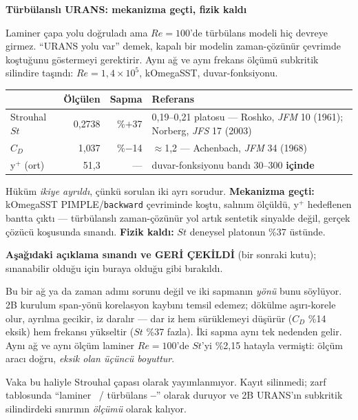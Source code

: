 \documentclass[11pt,a4paper]{article}
\newcommand{\ev}{\textcolor{iyi}{\textbf{\checkmark}}}
\newcommand{\hy}{\textcolor{kotu}{\textbf{--}}}
\newcommand{\kkkenar}{lacivert}
\newcommand{\kkzemin}{kod}
\newenvironment{renkkutu}[3]{%
  \renewcommand{\kkkenar}{#1}\renewcommand{\kkzemin}{#2}%
  \par\medskip\noindent
  \begin{lrbox}{\kutugovde}%
  \begin{minipage}{\dimexpr\linewidth-2\fboxsep-2\fboxrule\relax}\footnotesize
  \textcolor{#1}{\textbf{#3}}\par\vspace{3pt}%
}{%
  \end{minipage}%
  \end{lrbox}%
  \noindent\fcolorbox{\kkkenar}{\kkzemin}{\usebox{\kutugovde}}%
  \par\medskip
}
\newenvironment{reddedilir}[1]{\begin{renkkutu}{kotu}{kotubg}{#1}}{\end{renkkutu}}
\begin{document}
\begin{reddedilir}{Türbülanslı URANS: mekanizma geçti, fizik kaldı}
Laminer çapa yolu doğruladı ama $Re{=}100$'de türbülans modeli hiç devreye
girmez. ``URANS yolu var'' demek, kapalı bir modelin zaman-çözünür çevrimde
koştuğunu göstermeyi gerektirir. Aynı ağ ve aynı frekans ölçümü subkritik
silindire taşındı: $Re{=}1{,}4\times10^5$, kOmegaSST, duvar-fonksiyonu.

\begin{center}\footnotesize
\begin{tabular}{@{}lrrl@{}}
\toprule
& \textbf{Ölçülen} & \textbf{Sapma} & \textbf{Referans} \\
\midrule
Strouhal $St$ & 0{,}2738 & \%$+$37 & 0{,}19--0{,}21 platosu --- Roshko,
  \emph{JFM} 10 (1961); Norberg, \emph{JFS} 17 (2003) \\
$C_D$ & 1{,}037 & \%$-$14 & $\approx$1{,}2 --- Achenbach, \emph{JFM} 34 (1968) \\
y$^+$ (ort) & 51{,}3 & --- & duvar-fonksiyonu bandı 30--300 \textbf{içinde} \\
\bottomrule
\end{tabular}
\end{center}

\noindent Hüküm \emph{ikiye ayrıldı}, çünkü sorulan iki ayrı sorudur.
\textbf{Mekanizma geçti:} kOmegaSST PIMPLE/\texttt{backward} çevriminde koştu,
salınım ölçüldü, y$^+$ hedeflenen bantta çıktı --- türbülanslı zaman-çözünür yol
artık sentetik sinyalde değil, gerçek çözücü koşusunda sınandı.
\textbf{Fizik kaldı:} $St$ deneysel platonun \%37 üstünde.

\textbf{Aşağıdaki açıklama sınandı ve GERİ ÇEKİLDİ} (bir sonraki kutu); sınanabilir olduğu için buraya olduğu gibi bırakıldı.

Bu bir ağ ya da zaman adımı sorunu değil ve iki sapmanın \emph{yönü} bunu
söylüyor. 2B kurulum span-yönü korelasyon kaybını temsil edemez; dökülme
aşırı-korele olur, ayrılma gecikir, iz daralır --- dar iz hem sürüklemeyi
düşürür ($C_D$ \%14 eksik) hem frekansı yükseltir ($St$ \%37 fazla). İki
sapma aynı tek nedenden gelir. Aynı ağ ve aynı ölçüm laminer $Re{=}100$'de
$St$'yi \%2{,}15 hatayla vermişti: ölçüm aracı doğru, \emph{eksik olan üçüncü
boyuttur}.

Vaka bu haliyle Strouhal çapası olarak yayımlanmıyor. Kayıt silinmedi;
zarf tablosunda ``laminer \ev\ / türbülans \hy'' olarak duruyor ve 2B URANS'ın
subkritik silindirdeki sınırının \emph{ölçümü} olarak kalıyor.
\end{reddedilir}
\end{document}
